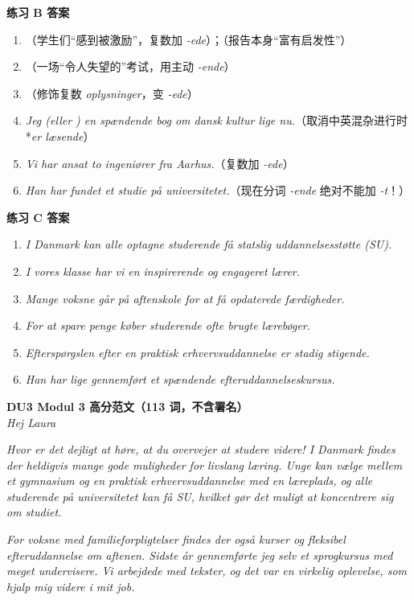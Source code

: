\begin{answerbox}
\textbf{练习 B 答案}
\begin{enumerate}
  \item {}（学生们“感到被激励”，复数加 \textit{-ede}）；（报告本身“富有启发性”）
  \item {}（一场“令人失望的”考试，用主动 \textit{-ende}）
  \item {}（修饰复数 \textit{oplysninger}，变 \textit{-ede}）
  \item \textit{Jeg  (eller ) en spændende bog om dansk kultur lige nu.}（取消中英混杂进行时 *\textit{er læsende}）
  \item \textit{Vi har ansat to  ingeniører fra Aarhus.}（复数加 \textit{-ede}）
  \item \textit{Han har fundet et  studie på universitetet.}（现在分词 \textit{-ende} 绝对不能加 \textit{-t}！）
\end{enumerate}

\textbf{练习 C 答案}
\begin{enumerate}
  \item \textit{I Danmark kan alle optagne studerende få statslig uddannelsesstøtte (SU).}
  \item \textit{I vores klasse har vi en inspirerende og engageret lærer.}
  \item \textit{Mange voksne går på aftenskole for at få opdaterede færdigheder.}
  \item \textit{For at spare penge køber studerende ofte brugte lærebøger.}
  \item \textit{Efterspørgslen efter en praktisk erhvervsuddannelse er stadig stigende.}
  \item \textit{Han har lige gennemført et spændende efteruddannelseskursus.}
\end{enumerate}

\textbf{DU3 Modul 3 高分范文（113 词，不含署名）}\\
\textit{Hej Laura}

\textit{Hvor er det dejligt at høre, at du overvejer at studere videre! I Danmark findes der heldigvis mange gode muligheder for livslang læring. Unge kan vælge mellem et gymnasium og en praktisk erhvervsuddannelse med en  læreplads, og alle  studerende på universitetet kan få SU, hvilket gør det muligt at koncentrere sig om studiet.}

\textit{For voksne med  familieforpligtelser findes der også  kurser og fleksibel efteruddannelse om aftenen. Sidste år gennemførte jeg selv et  sprogkursus med meget  undervisere. Vi arbejdede med  tekster, og det var en virkelig  oplevelse, som hjalp mig videre i mit job.}


\end{answerbox}
